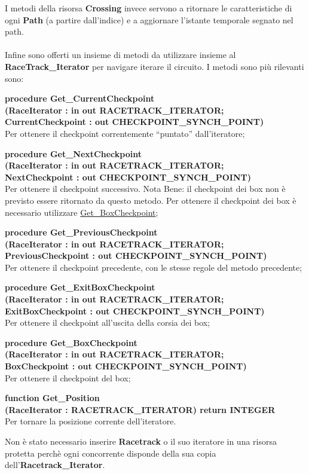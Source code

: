 I metodi della risorsa \textbf{Crossing} invece servono a ritornare le caratteristiche di ogni \textbf{Path} (a partire dall'indice) e a aggiornare
l'istante temporale segnato nel path.\\\\
Infine sono offerti un insieme di metodi da utilizzare insieme al \textbf{RaceTrack\_Iterator} per navigare iterare il circuito. I metodi sono pi\`{u}
rilevanti sono:
\begin{description}
\item{\textbf{procedure Get\_CurrentCheckpoint\\(RaceIterator : in out RACETRACK\_ITERATOR;\\ CurrentCheckpoint : out CHECKPOINT\_SYNCH\_POINT)}}\\
Per ottenere il checkpoint correntemente ``puntato'' dall'iteratore;
\item{\textbf{procedure Get\_NextCheckpoint\\(RaceIterator : in out RACETRACK\_ITERATOR;\\ NextCheckpoint : out CHECKPOINT\_SYNCH\_POINT)}}\\
Per ottenere il checkpoint successivo. Nota Bene: il checkpoint dei box non \`{e} previsto essere ritornato da questo metodo. Per ottenere il
checkpoint dei box \`{e} necessario utilizzare \underline{Get\_BoxCheckpoint};
\item{\textbf{procedure Get\_PreviousCheckpoint\\(RaceIterator : in out RACETRACK\_ITERATOR;\\ PreviousCheckpoint : out CHECKPOINT\_SYNCH\_POINT)}}\\
Per ottenere il checkpoint precedente, con le stesse regole del metodo precedente;
\item{\textbf{procedure Get\_ExitBoxCheckpoint\\(RaceIterator : in out RACETRACK\_ITERATOR;\\ ExitBoxCheckpoint : out CHECKPOINT\_SYNCH\_POINT)}}\\
Per ottenere il checkpoint all'uscita della corsia dei box;
\item{\textbf{procedure Get\_BoxCheckpoint\\(RaceIterator : in out RACETRACK\_ITERATOR;\\ BoxCheckpoint : out CHECKPOINT\_SYNCH\_POINT)}}\\
Per ottenere il checkpoint del box;
\item{\textbf{function Get\_Position\\(RaceIterator : RACETRACK\_ITERATOR) return INTEGER}}\\
Per tornare la posizione corrente dell'iteratore.
\end{description}
Non \`{e} stato necessario inserire \textbf{Racetrack} o il suo iteratore in una risorsa protetta perch\`{e} ogni concorrente disponde della
sua copia dell'\textbf{Racetrack\_Iterator}.
\newpage
